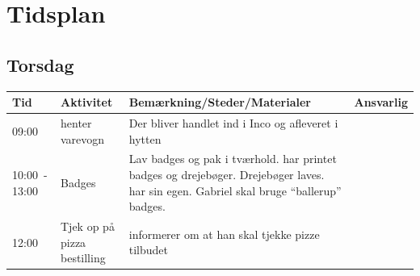 \section{Tidsplan}
\subsection{Torsdag}
\begin{tabular}{ | p{1cm} | p{4cm} | p{5.5cm} | p{4cm} | }
\hline
	Tid & Aktivitet & Bemærkning/Steder/Materialer & Ansvarlig \\ \hline
	09:00 & \KABS henter varevogn & Der bliver handlet ind i Inco og afleveret i hytten & \KABS \Hyttebombz{}  \\ \hline
	10:00~- 13:00 & Badges & Lav badges og pak i tværhold. \Ora har printet badges og drejebøger. Drejebøger laves. \KABS har sin egen. Gabriel skal bruge ``ballerup'' badges. & \KABS \Ora \Gabriel \\ \hline
	12:00 & Tjek op på pizza bestilling & \KABS informerer \YOLO om at han skal tjekke pizze tilbudet & \YOLO \\ \hline
\end{tabular}

